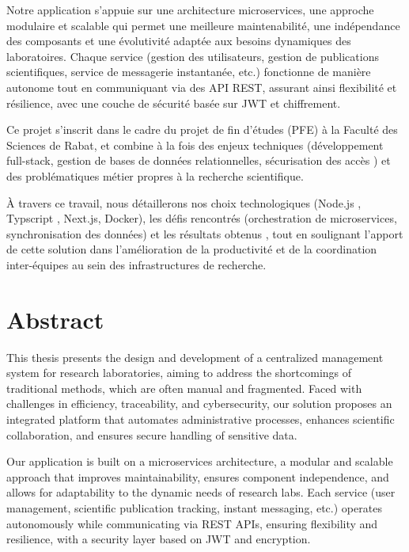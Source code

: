 \documentclass[12pt]{rapportPfe}
\begin{document}
Notre application s’appuie sur une architecture microservices, une approche modulaire et scalable qui permet une meilleure maintenabilité, une indépendance des composants et une évolutivité adaptée aux besoins dynamiques des laboratoires. Chaque service (gestion des utilisateurs, gestion de publications scientifiques, service de messagerie instantanée, etc.) fonctionne de manière autonome tout en communiquant via des API REST, assurant ainsi flexibilité et résilience, avec une couche de sécurité basée sur JWT et chiffrement.

Ce projet s’inscrit dans le cadre du projet de fin d’études (PFE) à la Faculté des Sciences de Rabat, et combine à la fois des enjeux techniques (développement full-stack, gestion de bases de données relationnelles, sécurisation des accès ) et des problématiques métier propres à la recherche scientifique.

À travers ce travail, nous détaillerons nos choix technologiques (Node.js , Typscript , Next.js, Docker), les défis rencontrés (orchestration de microservices, synchronisation des données) et les résultats obtenus , tout en soulignant l’apport de cette solution dans l’amélioration de la productivité et de la coordination inter-équipes au sein des infrastructures de recherche.

\newpage
\thispagestyle{empty}
\null
\newpage

\chapter*{Abstract}
This thesis presents the design and development of a centralized management system for research laboratories, aiming to address the shortcomings of traditional methods, which are often manual and fragmented. Faced with challenges in efficiency, traceability, and cybersecurity, our solution proposes an integrated platform that automates administrative processes, enhances scientific collaboration, and ensures secure handling of sensitive data.

Our application is built on a microservices architecture, a modular and scalable approach that improves maintainability, ensures component independence, and allows for adaptability to the dynamic needs of research labs. Each service (user management, scientific publication tracking, instant messaging, etc.) operates autonomously while communicating via REST APIs, ensuring flexibility and resilience, with a security layer based on JWT and encryption.
\end{document}
